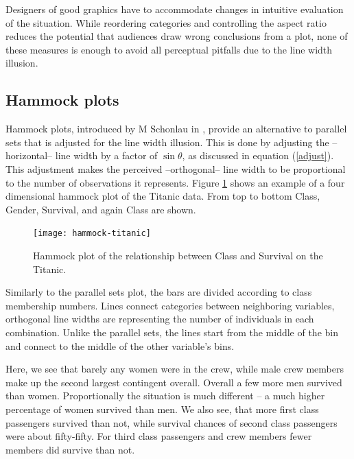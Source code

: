 Designers of good graphics have to accommodate changes in intuitive evaluation of the situation. While reordering categories and controlling the aspect ratio reduces the potential that audiences  draw wrong conclusions from a plot, none of these measures is enough to avoid all perceptual pitfalls due to the line width illusion.




\subsection{Hammock plots}

Hammock plots, introduced by M Schonlau in \citep{schonlau:2003}, provide an alternative to parallel sets that is adjusted for the line width illusion. This is done by  adjusting the --horizontal-- line width by  a factor of $\sin \theta$, as discussed in equation (\ref{adjust}). This adjustment makes the perceived --orthogonal-- line width to be proportional to the number of observations it represents. 
 Figure \ref{hammock} shows an example of a four dimensional hammock plot of the Titanic data. From top to bottom Class, Gender, Survival, and again Class are shown. 
\begin{figure}
\centering
\texttt{[image: hammock-titanic]}
\caption{\label{hammock} Hammock plot of the relationship between Class and Survival on the Titanic. }
\end{figure}

Similarly to the parallel sets plot, the bars are divided according to class membership numbers.  Lines connect categories between neighboring variables, orthogonal line widths are representing the number of individuals in each combination. Unlike the parallel sets, the lines start from the middle of the bin and connect to the middle of the other variable's bins. 

Here, we see that barely any women were in the crew, while male crew members make up the second largest contingent overall. Overall a few more men survived than women. Proportionally the situation is much different -- a much higher percentage of women survived than men. We also see, that more first class passengers survived than not, while  survival chances of second class passengers were about fifty-fifty. For third class passengers and crew members fewer members did  survive than not. 

